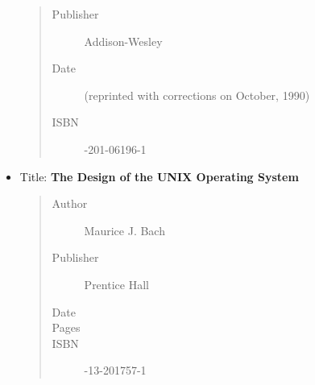 \documentclass[a4paper,8pt,english]{sphinxmanual}
\begin{document}
\begin{itemize}
\begin{quote}
\begin{description}
\item[{Publisher}] \leavevmode
Addison-Wesley

\item[{Date}]  (reprinted with corrections on October, 1990)

\item[{ISBN}] -201-06196-1

\end{description}\end{quote}

\item {} 
Title: \textbf{The Design of the UNIX Operating System}
\begin{quote}\begin{description}
\item[{Author}] \leavevmode
Maurice J. Bach

\item[{Publisher}] \leavevmode
Prentice Hall

\item[{Date}] 

\item[{Pages}] 

\item[{ISBN}] -13-201757-1

\end{description}\end{quote}

\end{itemize}
\end{document}
